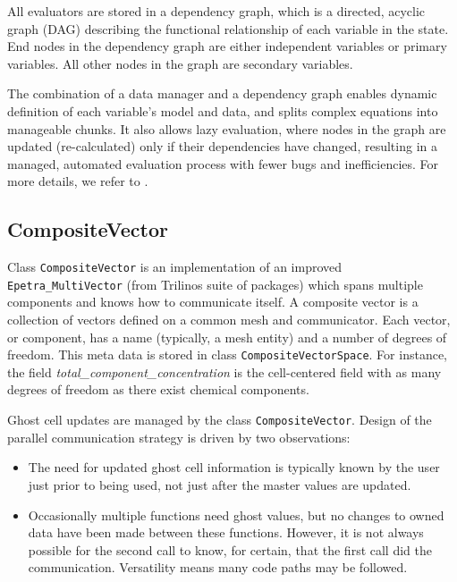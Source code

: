 All evaluators are stored in a dependency graph, which is a directed, acyclic graph (DAG) 
describing the functional relationship of each variable in the state. 
End nodes in the dependency graph are either independent variables or primary variables. 
All other nodes in the graph are secondary variables.

The combination of a data manager and a dependency graph enables dynamic definition of each variable's model 
and data, and splits complex equations into manageable chunks. 
It also allows lazy evaluation, where nodes in the graph are updated (re-calculated) only if their dependencies
have changed, resulting in a managed, automated evaluation process with fewer bugs and inefficiencies.
For more details, we refer to \cite{coon2016managing}.


\subsection{CompositeVector}
Class {\tt CompositeVector} is an implementation of an improved
{\tt Epetra\_MultiVector} (from Trilinos suite of packages) which spans multiple components and knows how to
communicate itself.
A composite vector is a collection of vectors defined on a common mesh and
communicator. 
Each vector, or component, has a name (typically, a mesh entity)
and a number of degrees of freedom.  
This meta data is stored in class {\tt CompositeVectorSpace}.
For instance, the field {\it total\_component\_concentration} is the cell-centered field with 
as many degrees of freedom as there exist chemical components.

Ghost cell updates are managed by the class {\tt CompositeVector}. 
Design of the parallel communication strategy is driven by two observations:
\begin{itemize}
\item The need for updated ghost cell information is typically known by the
      user just prior to being used, not just after the master values are
      updated.
\item Occasionally multiple functions need ghost values, but no changes to
      owned data have been made between these functions.  However, it is not
      always possible for the second call to know, for certain, that the first
      call did the communication.  Versatility means many code paths may be
      followed.
\end{itemize}


